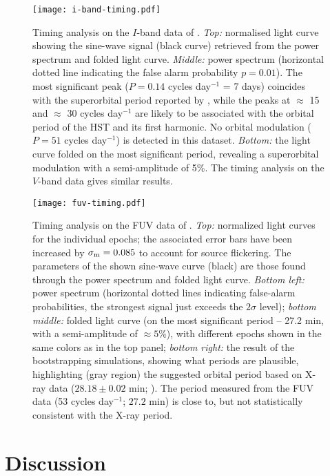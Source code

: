 \documentclass[a4paper,fleqn,usenatbib]{mnras}
\begin{document}
\begin{figure}	
	\texttt{[image: i-band-timing.pdf]}
	\caption{Timing analysis on the $I$-band data of \citet{2000ApJ...545L..47G}. {\it Top:} normalised light curve showing the sine-wave signal (black curve) retrieved from the power spectrum and folded light curve. {\it Middle:} power spectrum (horizontal dotted line indicating the false alarm probability $p = 0.01$). The most significant peak ($P = 0.14$ cycles day$^{-1}$ = 7 days) coincides with the superorbital period reported by \citet{2017MNRAS.467.2199B}, while the peaks at $\approx$ 15 and $\approx$ 30 cycles day$^{-1}$ are likely to be associated with the orbital period of the HST and its first harmonic. No orbital modulation ($P = 51$ cycles day$^{-1}$) is detected in this dataset. {\it Bottom:} the light curve folded on the most significant period, revealing a superorbital modulation with a semi-amplitude of 5\%. The timing analysis on the $V$-band data gives similar results.}
	\label{fig:i-timing}
\end{figure}

\begin{figure*}
	\texttt{[image: fuv-timing.pdf]}
	\caption{Timing analysis on the FUV data of \citet{2008ApJ...683.1006K}. {\it Top:} normalized light curves for the individual epochs; the associated error bars have been increased by $\sigma_{\rm m} = 0.085$ to account for source flickering. The parameters of the shown sine-wave curve (black) are those found through the power spectrum and folded light curve. {\it Bottom left:} power spectrum (horizontal dotted lines indicating false-alarm probabilities, the strongest signal just exceeds the $2\sigma$ level); {\it bottom middle:} folded light curve (on the most significant period -- 27.2 min, with a semi-amplitude of $\approx 5$\%), with different epochs shown in the same colors as in the top panel; {\it bottom right:} the result of the bootstrapping simulations, showing what periods are plausible, highlighting (gray region) the suggested orbital period based on X-ray data ($28.18 \pm 0.02$ min; \citealp{2017MNRAS.467.2199B}). The period measured from the FUV data (53 cycles day$^{-1}$; $27.2$ min) is close to, but not statistically consistent with the X-ray period.}
	\label{fig:fuv_timing}
\end{figure*}

\section{Discussion}
\end{document}
